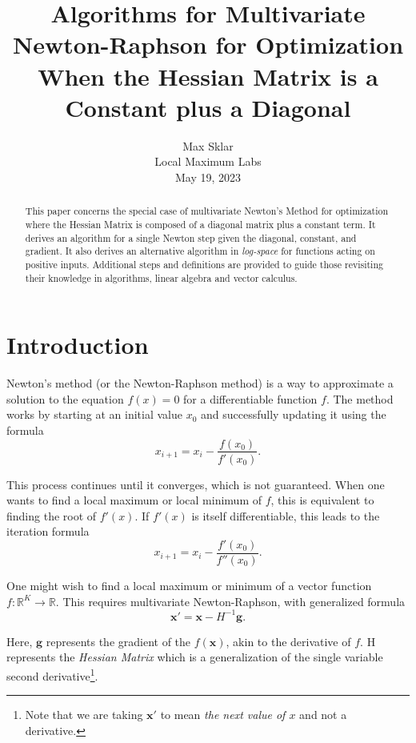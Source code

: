 \documentclass[twoside]{article}
\begin{document}
\parindent=0in
\parskip=12pt

\title{
Algorithms for Multivariate Newton-Raphson for Optimization \\
 \large{
    When the Hessian Matrix is a Constant plus a Diagonal
  }
}

\author{Max Sklar\\
Local Maximum Labs\\
May 19, 2023
}

\date{}

\maketitle
\thispagestyle{empty}

\begin{abstract}
This paper concerns the special case of multivariate Newton's Method for optimization where the Hessian Matrix is composed of a diagonal matrix plus a constant term. It derives an algorithm for a single Newton step given the diagonal, constant, and gradient. It also derives an alternative algorithm in \textit{log-space} for functions acting on positive inputs. Additional steps and definitions are provided to guide those revisiting their knowledge in algorithms, linear algebra and vector calculus.
\end{abstract}

\section{Introduction}

Newton's method (or the Newton-Raphson method) is a way to approximate a solution to the equation $f(x) = 0$ for a differentiable function $f$. The method works by starting at an initial value $x_0$ and successfully updating it using the formula
\[
x_{i+1} = x_i - \frac{f(x_0)}{f'(x_0)}.
\]

This process continues until it converges, which is not guaranteed. When one wants to find a local maximum or local minimum of $f$, this is equivalent to finding the root of $f'(x)$. If $f'(x)$ is itself differentiable, this leads to the iteration formula
\[
x_{i+1} = x_i - \frac{f'(x_0)}{f''(x_0)}.
\]

One might wish to find a local maximum or minimum of a vector function $f: \mathbb{R}^K \rightarrow \mathbb{R}$. This requires multivariate Newton-Raphson, with generalized formula
\[
\boldsymbol{x}' = \boldsymbol{x} - H^{-1}\boldsymbol{g}.
\]

Here, $\boldsymbol{g}$ represents the gradient of the $f(\boldsymbol{x})$, akin to the derivative of $f$. H represents the \textit{Hessian Matrix} which is a generalization of the single variable second derivative\footnote{Note that we are taking $\boldsymbol{x}' $ to mean \textit{the next value of $x$} and not a derivative.}.
\end{document}
